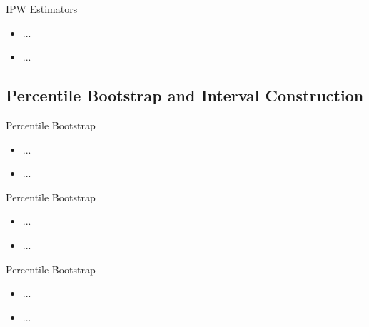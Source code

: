 \documentclass{beamer}
\begin{document}

\begin{frame}{IPW Estimators}

\begin{itemize}
  \itemsep12pt
  \item ...
  \item ...
\end{itemize}

\end{frame}

\subsection{Percentile Bootstrap and Interval Construction}

\begin{frame}{Percentile Bootstrap}

\begin{itemize}
  \itemsep12pt
  \item ...
  \item ...
\end{itemize}

\end{frame}


\begin{frame}{Percentile Bootstrap}

\begin{itemize}
  \itemsep12pt
  \item ...
  \item ...
\end{itemize}

\end{frame}


\begin{frame}{Percentile Bootstrap}

\begin{itemize}
  \itemsep12pt
  \item ...
  \item ...
\end{itemize}

\end{frame}
\end{document}
